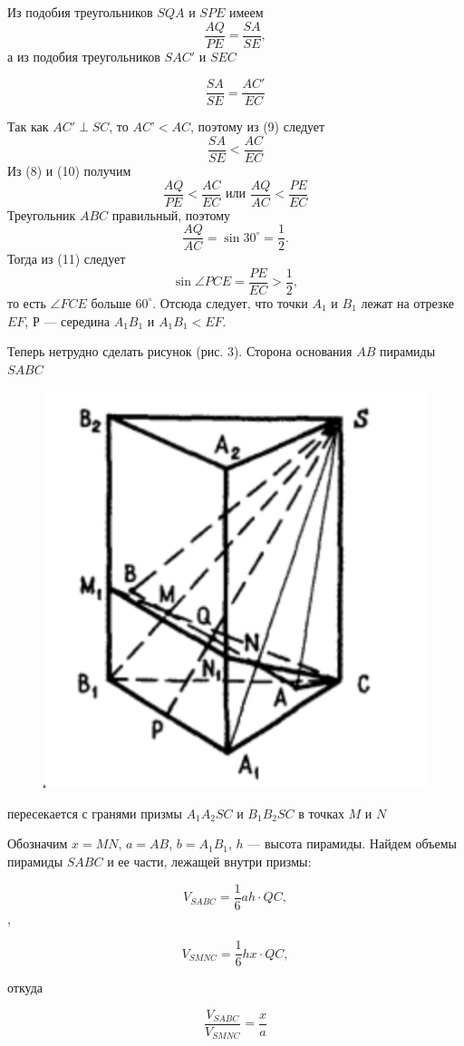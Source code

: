 \documentclass[a4paper, 12pt]{article}
\begin{document}
\setcounter{page}{63}
\pagestyle{myfooter1}

\begin{multicols}{2}
	Из подобия треугольников $SQA$ и $SPE$ имеем
	$$\frac{AQ}{PE} = \frac{SA}{SE},$$ 
	а из подобия треугольников  $SAC'$ и $SEC$
	
	$$\frac{SA}{SE} = \frac{AC'}{EC}$$
	
	Так как $AC' \perp SC$, то $AC’ < AC$, поэтому из (9) следует 
	$$\frac{SA}{SE} < \frac{AC}{EC}$$
	Из (8) и (10) получим 
	$$\frac{AQ}{PE} < \frac{AC}{EC} \text{ или } \frac{AQ}{AC} < \frac{PE}{EC}$$
	Треугольник $ABC$ правильный, поэтому 
	$$\frac{AQ}{AC} = \sin{30^\circ} = \frac12.$$
	Тогда из (11) следует 
	$$\sin{\angle PCE} = \frac{PE}{EC} > \frac12,$$
	то есть $\angle FCE$ больше $60^\circ$. Отсюда следует, что точки $A_1$ и $B_1$ лежат на отрезке $EF$, $Р$ --- середина $A_1B_1$ и $A_1B_1 < EF$.
	
	Теперь нетрудно сделать рисунок (рис. 3). Сторона основания $AB$ пирамиды  $SABC$
	
	\begin{figure}[H]
		\centering
		\includegraphics[width=.4\linewidth]{Image3.jpg}
		\caption{}
	\end{figure}
	
	пересекается с гранями призмы $A_1A_2SC$ и $B_1B_2SC$ в точках $M$  и $N$
	
	Обозначим $x = MN$, $a = AB$, $b = A_1B_1$, $h$ --- высота пирамиды. Найдем объемы пирамиды $SABC$ и ее части, лежащей внутри призмы:
	
	$$V_{SABC} = \frac16ah \cdot QC,$$,
	
	$$V_{SMNC} = \frac16hx \cdot QC,$$
	
	откуда
	
	$$\frac{V_{SABC}}{V_{SMNC}} = \frac{x}{a}$$
	

\end{multicols}
\end{document}
